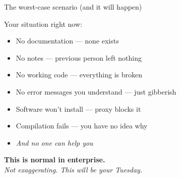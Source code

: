 \documentclass[aspectratio=169, 11pt]{beamer}
\begin{document}
	\begin{frame}{The worst-case scenario (and it will happen)}
		\begin{block}{Your situation right now:}
			\begin{itemize}
				\item No documentation — none exists
				\item No notes — previous person left nothing
				\item No working code — everything is broken
				\item No error messages you understand — just gibberish
				\item Software won't install — proxy blocks it
				\item Compilation fails — you have no idea why
				\item \textit{And no one can help you}
			\end{itemize}
		\end{block}
		\vspace{0.2cm}
		\alert{\textbf{This is normal in enterprise.}} \\
		\textit{Not exaggerating. This will be your Tuesday.}
	\end{frame}
	
\end{document}
